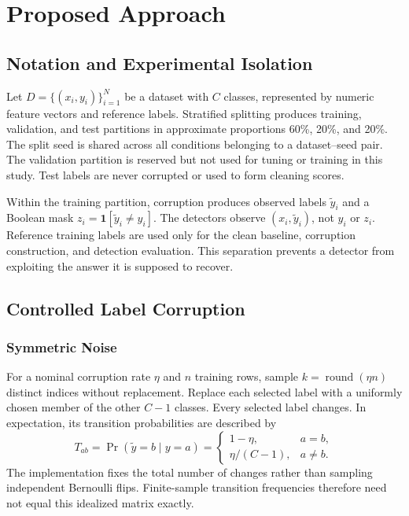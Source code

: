 \chapter{Proposed Approach}
\section{Notation and Experimental Isolation}
Let $D=\{(x_i,y_i)\}_{i=1}^{N}$ be a dataset with $C$ classes, represented by
numeric feature vectors and reference labels. Stratified splitting produces
training, validation, and test partitions in approximate proportions
60\%, 20\%, and 20\%. The split seed is shared across all conditions belonging
to a dataset--seed pair. The validation partition is reserved but not used
for tuning or training in this study. Test labels are never corrupted or used
to form cleaning scores.

Within the training partition, corruption produces observed labels
$\widetilde y_i$ and a Boolean mask $z_i=\mathbf{1}[\widetilde y_i\ne y_i]$.
The detectors observe $(x_i,\widetilde y_i)$, not $y_i$ or $z_i$.
Reference training labels are used only for the clean baseline, corruption
construction, and detection evaluation. This separation prevents a detector
from exploiting the answer it is supposed to recover.

\section{Controlled Label Corruption}
\subsection{Symmetric Noise}
For a nominal corruption rate $\eta$ and $n$ training rows, sample
$k=\operatorname{round}(\eta n)$ distinct indices without replacement. Replace
each selected label with a uniformly chosen member of the other $C-1$ classes.
Every selected label changes. In expectation, its transition probabilities
are described by
\begin{equation}
 T_{ab}=\Pr(\widetilde y=b\mid y=a)=
 \begin{cases}1-\eta,&a=b,\\ \eta/(C-1),&a\ne b.\end{cases}
\end{equation}
The implementation fixes the total number of changes rather than sampling
independent Bernoulli flips. Finite-sample transition frequencies therefore
need not equal this idealized matrix exactly.

